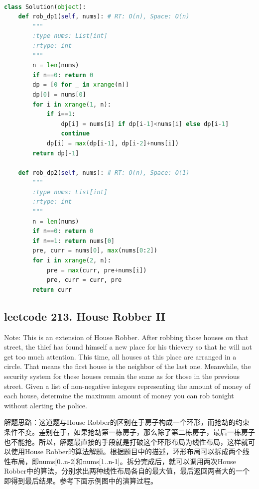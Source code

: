 \documentclass[a4paper,10pt]{article}
\begin{document}
\begin{lstlisting}[language=Python, caption=Problem198. House Robber]

class Solution(object):
    def rob_dp1(self, nums): # RT: O(n), Space: O(n)
        """
        :type nums: List[int]
        :rtype: int
        """
        n = len(nums)
        if n==0: return 0
        dp = [0 for _ in xrange(n)]
        dp[0] = nums[0]
        for i in xrange(1, n):
            if i==1:
                dp[i] = nums[i] if dp[i-1]<nums[i] else dp[i-1]
                continue
            dp[i] = max(dp[i-1], dp[i-2]+nums[i])
        return dp[-1]
    
    def rob_dp2(self, nums): # RT: O(n), Space: O(1)
        """
        :type nums: List[int]
        :rtype: int
        """
        n = len(nums)
        if n==0: return 0
        if n==1: return nums[0]
        pre, curr = nums[0], max(nums[0:2])
        for i in xrange(2, n):
            pre = max(curr, pre+nums[i])
            pre, curr = curr, pre
        return curr
\end{lstlisting}




\subsection{leetcode 213. House Robber II}
Note: This is an extension of House Robber. After robbing those houses on that street, the thief has found himself a new place for his thievery so that he will not get too much attention. This time, all houses at this place are arranged in a circle. That means the first house is the neighbor of the last one. Meanwhile, the security system for these houses remain the same as for those in the previous street. Given a list of non-negative integers representing the amount of money of each house, determine the maximum amount of money you can rob tonight without alerting the police. \\

\begin{CJK*}{UTF8}{gbsn}
\noindent 解题思路：这道题与House Robber的区别在于房子构成一个环形，而抢劫的约束条件不变。差别在于，如果抢劫第一栋房子，那么除了第二栋房子，最后一栋房子也不能抢。所以，解题最直接的手段就是打破这个环形布局为线性布局，这样就可以使用House Robber的算法解题。根据题目中的描述，环形布局可以拆成两个线性布局，即nums[0..n-2]和nums[1..n-1]。拆分完成后，就可以调用两次House Robber中的算法，分别求出两种线性布局各自的最大值，最后返回两者大的一个即得到最后结果。参考下面示例图中的演算过程。
\end{CJK*}
\end{document}
